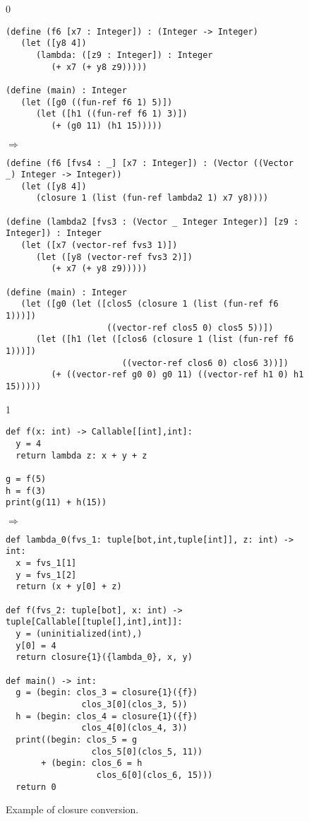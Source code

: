 \documentclass[7x10]{TimesAPriori_MIT}%
\def\racketEd{0}
\def\pythonEd{1}
\def\edition{1}
\newcommand{\pythonColor}[0]{}
\numberwithin{theorem}{chapter}
\numberwithin{definition}{chapter}
\numberwithin{equation}{chapter}
\begin{document}
\begin{figure}[tbp]
  \begin{tcolorbox}[colback=white]
    \begin{minipage}{0.8\textwidth}
{\if\edition\racketEd
\begin{lstlisting}[basicstyle=\ttfamily\footnotesize]
(define (f6 [x7 : Integer]) : (Integer -> Integer)
   (let ([y8 4])
      (lambda: ([z9 : Integer]) : Integer
         (+ x7 (+ y8 z9)))))

(define (main) : Integer
   (let ([g0 ((fun-ref f6 1) 5)])
      (let ([h1 ((fun-ref f6 1) 3)])
         (+ (g0 11) (h1 15)))))
\end{lstlisting}
$\Rightarrow$
\begin{lstlisting}[basicstyle=\ttfamily\footnotesize]
(define (f6 [fvs4 : _] [x7 : Integer]) : (Vector ((Vector _) Integer -> Integer))
   (let ([y8 4])
      (closure 1 (list (fun-ref lambda2 1) x7 y8))))

(define (lambda2 [fvs3 : (Vector _ Integer Integer)] [z9 : Integer]) : Integer
   (let ([x7 (vector-ref fvs3 1)])
      (let ([y8 (vector-ref fvs3 2)])
         (+ x7 (+ y8 z9)))))

(define (main) : Integer
   (let ([g0 (let ([clos5 (closure 1 (list (fun-ref f6 1)))])
                    ((vector-ref clos5 0) clos5 5))])
      (let ([h1 (let ([clos6 (closure 1 (list (fun-ref f6 1)))])
                       ((vector-ref clos6 0) clos6 3))])
         (+ ((vector-ref g0 0) g0 11) ((vector-ref h1 0) h1 15)))))
\end{lstlisting}
\fi}
%
{\if\edition\pythonEd\pythonColor
\begin{lstlisting}
def f(x: int) -> Callable[[int],int]:
  y = 4
  return lambda z: x + y + z

g = f(5)
h = f(3)
print(g(11) + h(15))
\end{lstlisting}
$\Rightarrow$
\begin{lstlisting}
def lambda_0(fvs_1: tuple[bot,int,tuple[int]], z: int) -> int:
  x = fvs_1[1]
  y = fvs_1[2]
  return (x + y[0] + z)

def f(fvs_2: tuple[bot], x: int) -> tuple[Callable[[tuple[],int],int]]:
  y = (uninitialized(int),)
  y[0] = 4
  return closure{1}({lambda_0}, x, y)

def main() -> int:
  g = (begin: clos_3 = closure{1}({f})
               clos_3[0](clos_3, 5))
  h = (begin: clos_4 = closure{1}({f})
               clos_4[0](clos_4, 3))
  print((begin: clos_5 = g
                 clos_5[0](clos_5, 11))
       + (begin: clos_6 = h
                  clos_6[0](clos_6, 15)))
  return 0
\end{lstlisting}
\fi}
\end{minipage}
  \end{tcolorbox}

  \caption{Example of closure conversion.}
\label{fig:lexical-functions-example}
\end{figure}
\end{document}
